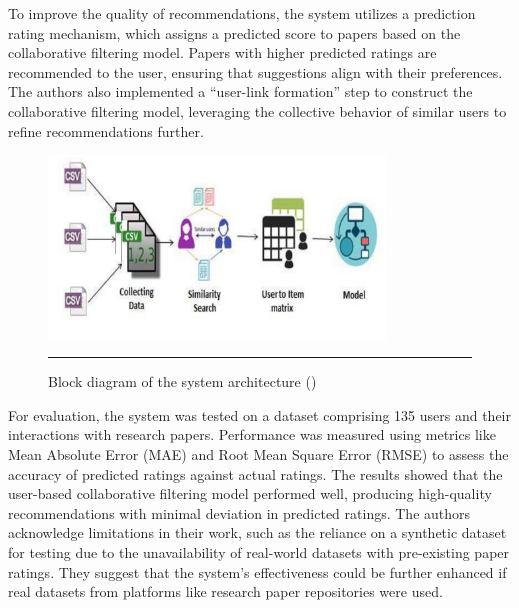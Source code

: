To improve the quality of recommendations, the system utilizes a prediction rating mechanism, which assigns a predicted score to papers based on the collaborative filtering model.
Papers with higher predicted ratings are recommended to the user, ensuring that suggestions align with their preferences.
The authors also implemented a ``user-link formation'' step to construct the collaborative filtering model, leveraging the collective behavior of similar users to refine recommendations further.

\begin{figure}[htbp]
    \centering
 \includegraphics[width=0.8\textwidth]{03_Figures/literature-review/murali.png}
     \rule{35em}{0.5pt}
    \caption{Block diagram of the system architecture (\cite{Murali2019})}
 \label{fig:murali}
\end{figure}

For evaluation, the system was tested on a dataset comprising 135 users and their interactions with research papers.
Performance was measured using metrics like Mean Absolute Error (MAE) and Root Mean Square Error (RMSE) to assess the accuracy of predicted ratings against actual ratings.
The results showed that the user-based collaborative filtering model performed well, producing high-quality recommendations with minimal deviation in predicted ratings.
The authors acknowledge limitations in their work, such as the reliance on a synthetic dataset for testing due to the unavailability of real-world datasets with pre-existing paper ratings.
They suggest that the system's effectiveness could be further enhanced if real datasets from platforms like research paper repositories were used.

